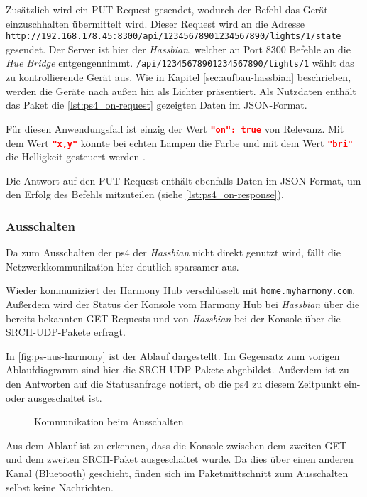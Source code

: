 Zusätzlich wird ein PUT-Request gesendet, wodurch der Befehl das Gerät einzuschhalten übermittelt wird.
Dieser Request wird an die Adresse \nolinkurl{http://192.168.178.45:8300/api/12345678901234567890/lights/1/state} gesendet.
Der Server ist hier der \textit{Hassbian}, welcher an Port 8300 Befehle an die \textit{Hue Bridge} entgengennimmt.
\texttt{/api/12345678901234567890/lights/1} wählt das zu kontrollierende Gerät aus.
Wie in Kapitel \ref{sec:aufbau-hassbian} \textit{} beschrieben, werden die Geräte nach außen hin als Lichter präsentiert.
Als Nutzdaten enthält das Paket die \autoref{lst:ps4_on-request} gezeigten Daten im JSON-Format.

Für diesen Anwendungsfall ist einzig der Wert \lstinline[language=json]{"on": true} von Relevanz.
Mit dem Wert \lstinline[language=json]{"x,y"} könnte bei echten Lampen die Farbe
und mit dem Wert \lstinline[language=json]{"bri"} die Helligkeit gesteuert werden \cite{Coreconc26:online}.

Die Antwort auf den PUT-Request enthält ebenfalls Daten im JSON-Format,
um den Erfolg des Befehls mitzuteilen (siehe \autoref{lst:ps4_on-response}).



\subsubsection{Ausschalten}

Da zum Ausschalten der \ac{ps4} der \textit{Hassbian} nicht direkt genutzt wird,
fällt die Netzwerkkommunikation hier deutlich sparsamer aus.

Wieder kommuniziert der Harmony Hub verschlüsselt mit \nolinkurl{home.myharmony.com}.
Außerdem wird der Status der Konsole vom Harmony Hub bei \textit{Hassbian} über die bereits bekannten GET-Requests
und von \textit{Hassbian} bei der Konsole über die SRCH-UDP-Pakete erfragt.

In \autoref{fig:ps-aus-harmony} ist der Ablauf dargestellt.
Im Gegensatz zum vorigen Ablaufdiagramm sind hier die SRCH-UDP-Pakete abgebildet.
Außerdem ist zu den Antworten auf die Statusanfrage notiert,
ob die \ac{ps4} zu diesem Zeitpunkt ein- oder ausgeschaltet ist.


\begin{figure}[ht!]
    \centering
    \resizebox{\textwidth}{!}{
        
    }
    \caption{Kommunikation beim Ausschalten}
    \label{fig:ps-aus-harmony}
\end{figure}

Aus dem Ablauf ist zu erkennen,
dass die Konsole zwischen dem zweiten GET- und dem zweiten SRCH-Paket ausgeschaltet wurde.
Da dies über einen anderen Kanal (Bluetooth) geschieht,
finden sich im Paketmittschnitt zum Ausschalten selbst keine Nachrichten.